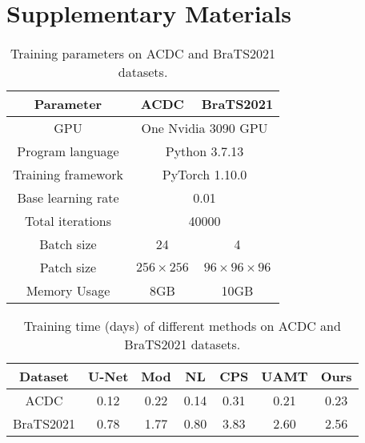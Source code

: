 \documentclass[runningheads]{llncs}
\begin{document}



\newpage
\section{Supplementary Materials}

\begin{table}[htb]
\begin{center}
\caption{Training parameters on ACDC and BraTS2021 datasets.}
\label{table:param1}
\begin{tabular}{c|cc}
\toprule
Parameter&ACDC&BraTS2021\\
\midrule
GPU&\multicolumn{2}{c}{One Nvidia 3090 GPU}\\
Program language&\multicolumn{2}{c}{Python 3.7.13}\\
Training framework&\multicolumn{2}{c}{PyTorch 1.10.0}\\
Base learning rate&\multicolumn{2}{c}{0.01}\\
Total iterations&\multicolumn{2}{c}{40000}\\
Batch size& 24 & 4\\
Patch size&$256\times256$&$96\times96\times96$\\
Memory Usage & 8GB &10GB\\
\bottomrule
\end{tabular}
\end{center}
\end{table}

\begin{table}[h]
\begin{center}
\caption{Training time (days) of different methods on ACDC and BraTS2021 datasets.}
\label{table:param2}
\begin{tabular}{c|cccccc}
\toprule
Dataset&U-Net&Mod&NL&CPS&UAMT&Ours\\
\midrule
ACDC&0.12&0.22&0.14&0.31&0.21&0.23\\
BraTS2021 &0.78&1.77&0.80&3.83&2.60&2.56 \\
\bottomrule
\end{tabular}
\end{center}
\end{table}
\end{document}
